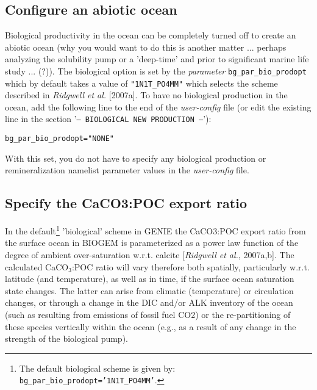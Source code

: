\documentclass[10pt,twoside]{article}
\begin{document}

\subsection{Configure an abiotic ocean}\label{Have an abiotic ocean}

Biological productivity in the ocean can be completely turned off to create an abiotic ocean (why you would want to do this is another matter ... perhaps analyzing the solubility pump or a 'deep-time' and prior to significant marine life study ... (?)). The biological option is set by the \textit{parameter} \texttt{bg\_par\_bio\_prodopt} which by default takes a value of \texttt{"1N1T\_PO4MM"} which selects the scheme described in \textit{Ridgwell et al.} [2007a]. To have no biological production in the ocean, add the following line to the end of the \textit{user-config} file (or edit the existing line in the section '\texttt{--- BIOLOGICAL NEW PRODUCTION ---}'):
\vspace{-11pt}\begin{verbatim}
bg_par_bio_prodopt="NONE"
\end{verbatim}\vspace{-5.5pt}
With this set, you do not have to specify any biological production or remineralization namelist parameter values in the \textit{user-config} file.


\subsection{Specify the CaCO3:POC export ratio}\label{CaCO3:POCrainratio}

In the default\footnote{The default biological scheme is given by: \texttt{bg\_par\_bio\_prodopt='1N1T\_PO4MM'}.} 'biological' scheme in GENIE the CaCO3:POC export ratio from the surface ocean in BIOGEM is parameterized as a power law function of the degree of ambient over-saturation w.r.t. calcite [\textit{Ridgwell et al.}, 2007a,b]. The calculated CaCO\begin{math}_3\end{math}:POC ratio will vary therefore both spatially, particularly w.r.t. latitude (and temperature), as well as in time, if the surface ocean saturation state changes. The latter can arise from climatic (temperature) or circulation changes, or through a change in the DIC and/or ALK inventory of the ocean (such as resulting from emissions of fossil fuel CO2) or the re-partitioning of these species vertically within the ocean (e.g., as a result of any change in the strength of the biological pump).
\end{document}
